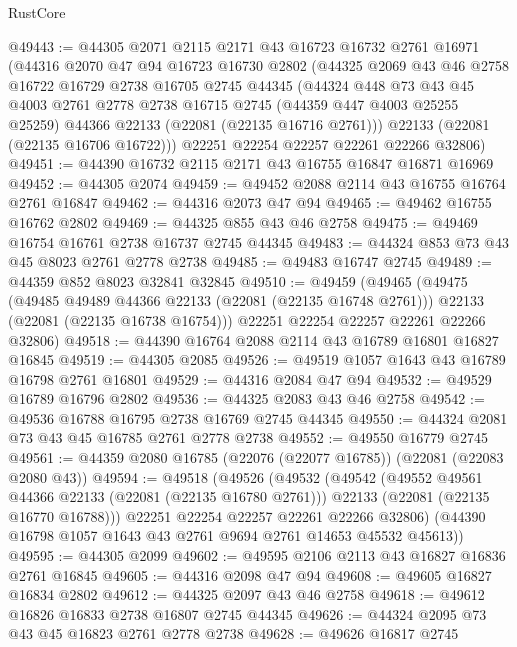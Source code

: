 \begin{lexlean}{RustCore}
\begin{coremodule}
@49443 := @44305
    @2071
    @2115
    @2171
    @43
    @16723
    @16732
    @2761
    @16971
    (@44316
      @2070
      @47
      @94
      @16723
      @16730
      @2802
      (@44325
        @2069
        @43
        @46
        @2758
        @16722
        @16729
        @2738
        @16705
        @2745
        @44345
        (@44324
          @448
          @73
          @43
          @45
          @4003
          @2761
          @2778
          @2738
          @16715
          @2745
          (@44359 @447 @4003 @25255 @25259)
          @44366
          @22133
          (@22081 (@22135 @16716 @2761)))
        @22133
        (@22081 (@22135 @16706 @16722)))
      @22251
      @22254
      @22257
      @22261
      @22266
      @32806)
@49451 := @44390 @16732 @2115 @2171 @43 @16755 @16847 @16871 @16969
@49452 := @44305 @2074
@49459 := @49452 @2088 @2114 @43 @16755 @16764 @2761 @16847
@49462 := @44316 @2073 @47 @94
@49465 := @49462 @16755 @16762 @2802
@49469 := @44325 @855 @43 @46 @2758
@49475 := @49469 @16754 @16761 @2738 @16737 @2745 @44345
@49483 := @44324 @853 @73 @43 @45 @8023 @2761 @2778 @2738
@49485 := @49483 @16747 @2745
@49489 := @44359 @852 @8023 @32841 @32845
@49510 := @49459
    (@49465
      (@49475
        (@49485 @49489 @44366 @22133 (@22081 (@22135 @16748 @2761)))
        @22133
        (@22081 (@22135 @16738 @16754)))
      @22251
      @22254
      @22257
      @22261
      @22266
      @32806)
@49518 := @44390 @16764 @2088 @2114 @43 @16789 @16801 @16827 @16845
@49519 := @44305 @2085
@49526 := @49519 @1057 @1643 @43 @16789 @16798 @2761 @16801
@49529 := @44316 @2084 @47 @94
@49532 := @49529 @16789 @16796 @2802
@49536 := @44325 @2083 @43 @46 @2758
@49542 := @49536 @16788 @16795 @2738 @16769 @2745 @44345
@49550 := @44324 @2081 @73 @43 @45 @16785 @2761 @2778 @2738
@49552 := @49550 @16779 @2745
@49561 := @44359 @2080 @16785 (@22076 (@22077 @16785)) (@22081 (@22083 @2080 @43))
@49594 := @49518
    (@49526
      (@49532
        (@49542
          (@49552 @49561 @44366 @22133 (@22081 (@22135 @16780 @2761)))
          @22133
          (@22081 (@22135 @16770 @16788)))
        @22251
        @22254
        @22257
        @22261
        @22266
        @32806)
      (@44390 @16798 @1057 @1643 @43 @2761 @9694 @2761 @14653 @45532 @45613))
@49595 := @44305 @2099
@49602 := @49595 @2106 @2113 @43 @16827 @16836 @2761 @16845
@49605 := @44316 @2098 @47 @94
@49608 := @49605 @16827 @16834 @2802
@49612 := @44325 @2097 @43 @46 @2758
@49618 := @49612 @16826 @16833 @2738 @16807 @2745 @44345
@49626 := @44324 @2095 @73 @43 @45 @16823 @2761 @2778 @2738
@49628 := @49626 @16817 @2745

\end{coremodule}
\end{lexlean}
